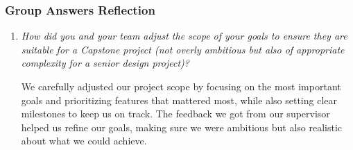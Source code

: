 \documentclass{article}
\begin{document}
\subsubsection*{Group Answers Reflection}
\begin{enumerate}
  \item \textit{How did you and your team adjust the scope of your goals to ensure they are suitable for a Capstone project (not overly 
  ambitious but also of appropriate complexity for a senior design project)?}
  
  We carefully adjusted our project scope by focusing on the most important goals and prioritizing features that mattered most, while also 
  setting clear milestones to keep us on track. The feedback we got from our supervisor helped us refine our goals, making sure we were ambitious but
  also realistic about what we could achieve.
    
\end{enumerate}


\end{document}
